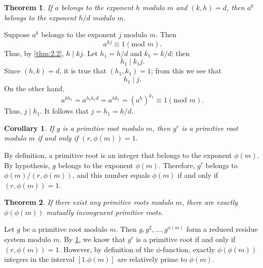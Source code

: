 \documentclass{article}
\makeatletter
\newtheorem{theorem}{Theorem}[section]
\newtheorem{corollary}{Corollary}[section]
\theoremstyle{definition}
\theoremstyle{remark}
\let\oldproofname=\proofname
\renewcommand{\proofname}{\textit{\oldproofname}}
\theoremstyle{definition}
\renewenvironment{proof}[1][\proofname]{\par
  \pushQED{\qed}%
  \normalfont \topsep6\p@\@plus6\p@\relax
  \list{}{\leftmargin=0mm
          \rightmargin=0mm
          \settowidth{\itemindent}{\itshape#1}%
          \labelwidth=\itemindent
          \parsep=0pt \listparindent=0mm%
  }
  \item[\hskip\labelsep
        \itshape
    #1\@addpunct{.}]\ignorespaces
}{%
  \popQED\endlist\@endpefalse
}
\makeatother
\begin{document}
    \begin{theorem}\label{thm:2.4}
        If $a$ belongs to the exponent $h$ modulo $m$ and $(k,h)=d$, then $a^k$ belongs to the exponent $h/d$ modulo $m$.
    \end{theorem}
        \begin{proof}
            Suppose $a^k$ belongs to the exponent $j$ modulo $m$. Then 
                \begin{equation*}
                    a^{kj}\equiv 1(\text{mod }m).
                \end{equation*}
            Thus, by \cref{thm:2.2}, $h\mid kj$. Let $h_1=h/d$ and $k_1=k/d$; then 
                \begin{equation*}
                    h_1\mid k_1j.
                \end{equation*}
            Since $(h,k)=d$, it is true that $(h_1,k_1)=1$; from this we see that 
                \begin{equation*}
                    h_1\mid j.
                \end{equation*}
            On the other hand, 
                \begin{equation*}
                    a^{kh_1}=a^{h_1k_1d}=a^{hk_1}=(a^h)^{k_1}\equiv 1(\text{mod }m).
                \end{equation*}
            Thus, $j\mid h_1$. It follows that $j=h_1=h/d$.
        \end{proof}
    \begin{corollary}\label{cor:2.1}
        If $g$ is a primitive root modulo $m$, then $g^r$ is a primitive root modulo $m$ if and only if $(r,\phi(m))=1$.
    \end{corollary}
        \begin{proof}
            By definition, a primitive root is an integer that belongs to the exponent $\phi(m)$. By hypothesis, $g$ belongs to the exponent $\phi(m)$. Therefore, $g^r$ belongs to $\phi(m)/(r,\phi(m))$, and this number equals $\phi(m)$ if and only if $(r,\phi(m))=1$.
        \end{proof}
    \begin{theorem}\label{thm:2.5}
        If there exist any primitive roots modulo $m$, there are exactly $\phi(\phi(m))$ mutually incongruent primitive roots. 
    \end{theorem}
        \begin{proof}
            Let $g$ be a primitive root modulo $m$. Then $g,g^2,\dots,g^{\phi(m)}$ form a reduced residue system modulo $m$. By \ref{cor:2.1}, we know that $g^r$ is a primitive root if and only if $(r,\phi(m))=1$. However, by definition of the $\phi$-function, exactly $\phi(\phi(m))$ integers in the interval $[1.\phi(m)]$ are relatively prime to $\phi(m)$.
        \end{proof}
\end{document}
